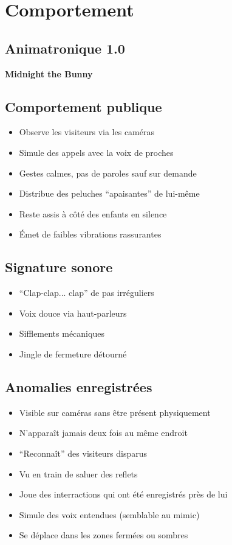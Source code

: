 \section{Comportement} %

\subsection{Animatronique 1.0}
\textbf{Midnight the Bunny}

\subsection*{Comportement publique}
\begin{itemize}[noitemsep]

  \item Observe les visiteurs via les caméras
  \item Simule des appels avec la voix de proches
  \item Gestes calmes, pas de paroles sauf sur demande
  \item Distribue des peluches “apaisantes” de lui-même
  \item Reste assis à côté des enfants en silence
  \item Émet de faibles vibrations rassurantes
\end{itemize}

\subsection*{Signature sonore}
\begin{itemize}[noitemsep]
  \item ``Clap-clap... clap'' de pas irréguliers
  \item Voix douce via haut-parleurs
  \item Sifflements mécaniques
  \item Jingle de fermeture détourné
\end{itemize}

\subsection*{Anomalies enregistrées}
\begin{itemize}[noitemsep]
  \item Visible sur caméras sans être présent physiquement
  \item N'apparaît jamais deux fois au même endroit
  \item ``Reconnaît'' des visiteurs disparus
  \item Vu en train de saluer des reflets
  \item Joue des interractions qui ont été enregistrés près de lui
  \item Simule des voix entendues (semblable au mimic)
  \item Se déplace dans les zones fermées ou sombres
\end{itemize}

